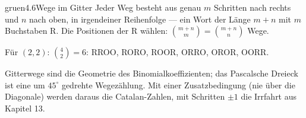 \begin{loesungkarte}{gruen}{4.6}{Wege im Gitter}
Jeder Weg besteht aus genau $m$ Schritten nach rechts und $n$ nach oben, in irgendeiner Reihenfolge --- ein Wort der Länge $m + n$ mit $m$ Buchstaben R. Die Positionen der R wählen: $\binom{m + n}m = \binom{m + n}n$ Wege.

Für $(2, 2)$: $\binom42 = 6$: RROO, RORO, ROOR, ORRO, OROR, OORR. \checkmark
{}
\begin{mitnehmen}\kastentext
Gitterwege sind die Geometrie des Binomialkoeffizienten; das Pascalsche Dreieck ist eine um $45^{\circ}$ gedrehte Wegezählung. Mit einer Zusatzbedingung (nie über die Diagonale) werden daraus die Catalan-Zahlen, mit Schritten $\pm1$ die Irrfahrt aus Kapitel 13.
\end{mitnehmen}
\end{loesungkarte}

